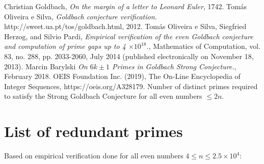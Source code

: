 \documentclass[10pt,twocolumn]{article}
\begin{document}
\begin{thebibliography}{9}
  Christian Goldbach, 
  \emph{On the margin of a letter to Leonard Euler},
  1742.
  Tomás Oliveira e Silva,
  \emph{Goldbach conjecture verification.}
  http://sweet.ua.pt/tos/goldbach.html,
  2012.
  Tomás Oliveira e Silva, Siegfried Herzog, and Silvio Pardi, 
  \emph{Empirical verification of the even Goldbach conjecture and computation of prime gaps up to 4 $\times 10^{18}$.}, 
  Mathematics of Computation, vol. 83, no. 288, pp. 2033-2060, 
  July 2014 (published electronically on November 18, 2013).
  Marcin Barylski
  \emph{On $6k \pm 1$ Primes in Goldbach Strong Conjecture.}, 
  February 2018.
  OEIS Foundation Inc. (2019), The On-Line Encyclopedia of Integer Sequences, https://oeis.org/A328179. Number of distinct primes required to satisfy the Strong Goldbach Conjecture for all even numbers $\leq 2n$.

\appendix
\section{List of redundant primes}

Based on empirical verification done for all even numbers $4 \leq n \leq 2.5 \times 10^4$:


\end{thebibliography}
\end{document}
